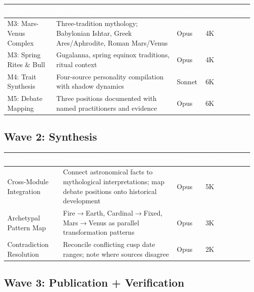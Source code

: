 \documentclass[11pt,letterpaper]{article}
\newcommand{\tableheader}[1]{\textbf{\sffamily\textcolor{white}{#1}}}
\begin{document}
\begin{center}
\begin{tabularx}{\textwidth}{L{3cm}XC{1.5cm}C{1.5cm}}
\toprule
{}
\tableheader{Task} & \tableheader{Description} & \tableheader{Model} & \tableheader{Est.\ Tokens} \\
\midrule
M3: Mars-Venus Complex & Three-tradition mythology; Babylonian Ishtar, Greek Ares/Aphrodite, Roman Mars/Venus & Opus & 4K \\
M3: Spring Rites \& Bull & Gugalanna, spring equinox traditions, ritual context & Opus & 4K \\
M4: Trait Synthesis & Four-source personality compilation with shadow dynamics & Sonnet & 6K \\
M5: Debate Mapping & Three positions documented with named practitioners and evidence & Opus & 6K \\
\bottomrule
\end{tabularx}
\end{center}

\subsection{Wave 2: Synthesis}

\begin{center}
\begin{tabularx}{\textwidth}{L{3cm}XC{1.5cm}C{1.5cm}}
\toprule
{}
\tableheader{Task} & \tableheader{Description} & \tableheader{Model} & \tableheader{Est.\ Tokens} \\
\midrule
Cross-Module Integration & Connect astronomical facts to mythological interpretations; map debate positions onto historical development & Opus & 5K \\
Archetypal Pattern Map & Fire$\rightarrow$Earth, Cardinal$\rightarrow$Fixed, Mars$\rightarrow$Venus as parallel transformation patterns & Opus & 3K \\
Contradiction Resolution & Reconcile conflicting cusp date ranges; note where sources disagree & Opus & 2K \\
\bottomrule
\end{tabularx}
\end{center}

\subsection{Wave 3: Publication + Verification}
\end{document}
